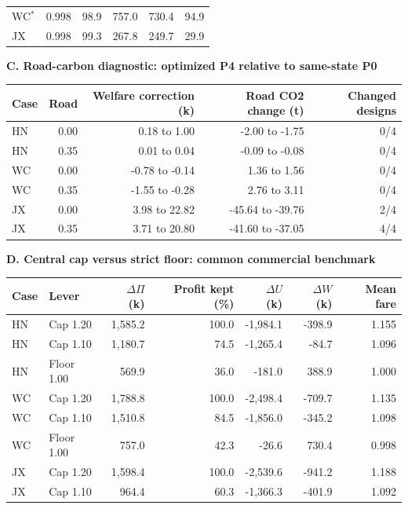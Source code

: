 \begin{table}[htbp]
\begin{minipage}{.95\textwidth}
\begin{tabular*}{\linewidth}{@{\extracolsep{\fill}}lrrrrr@{}}
WC$^{*}$ & 0.998 & 98.9 & 757.0 & 730.4 & 94.9 \\
JX & 0.998 & 99.3 & 267.8 & 249.7 & 29.9 \\
\bottomrule\end{tabular*}\par\medskip
\par\noindent\textbf{C. Road-carbon diagnostic: optimized P4 relative to same-state P0}\par\smallskip
\begin{tabular*}{\linewidth}{@{\extracolsep{\fill}}lrrrr@{}}\toprule
Case & Road & Welfare correction (k) & Road CO2 change (t) & Changed designs \\
\midrule
HN & 0.00 & 0.18 to 1.00 & -2.00 to -1.75 & 0/4 \\
HN & 0.35 & 0.01 to 0.04 & -0.09 to -0.08 & 0/4 \\
WC & 0.00 & -0.78 to -0.14 & 1.36 to 1.56 & 0/4 \\
WC & 0.35 & -1.55 to -0.28 & 2.76 to 3.11 & 0/4 \\
JX & 0.00 & 3.98 to 22.82 & -45.64 to -39.76 & 2/4 \\
JX & 0.35 & 3.71 to 20.80 & -41.60 to -37.05 & 4/4 \\
\bottomrule\end{tabular*}\par\medskip
\par\noindent\textbf{D. Central cap versus strict floor: common commercial benchmark}\par\smallskip
\begin{tabular*}{\linewidth}{@{\extracolsep{\fill}}llrrrrr@{}}\toprule
Case & Lever & $\Delta\Pi$ (k) & Profit kept (\%) & $\Delta U$ (k) & $\Delta W$ (k) & Mean fare \\
\midrule
HN & Cap 1.20 & 1,585.2 & 100.0 & -1,984.1 & -398.9 & 1.155 \\
HN & Cap 1.10 & 1,180.7 & 74.5 & -1,265.4 & -84.7 & 1.096 \\
HN & Floor 1.00 & 569.9 & 36.0 & -181.0 & 388.9 & 1.000 \\
WC & Cap 1.20 & 1,788.8 & 100.0 & -2,498.4 & -709.7 & 1.135 \\
WC & Cap 1.10 & 1,510.8 & 84.5 & -1,856.0 & -345.2 & 1.098 \\
WC & Floor 1.00 & 757.0 & 42.3 & -26.6 & 730.4 & 0.998 \\
JX & Cap 1.20 & 1,598.4 & 100.0 & -2,539.6 & -941.2 & 1.188 \\
JX & Cap 1.10 & 964.4 & 60.3 & -1,366.3 & -401.9 & 1.092 \\

\end{tabular*}
\end{minipage}
\end{table}

